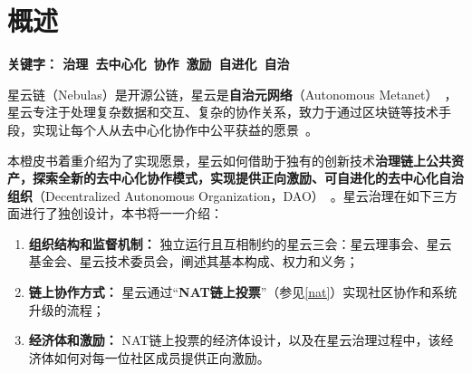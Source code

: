 \section{概述}

\textbf{关键字： 治理\ 去中心化\ 协作\ 激励\ 自进化\ 自治 }

\vspace{2em}

星云链（Nebulas）是开源公链，星云是\textbf{自治元网络}（Autonomous Metanet）~\cite{AutonomousMetanet}，星云专注于处理复杂数据和交互、复杂的协作关系，致力于通过区块链等技术手段，实现让每个人从去中心化协作中公平获益的愿景~\cite{vision}。

本橙皮书着重介绍为了实现愿景，星云如何借助于独有的创新技术\textbf{治理链上公共资产，探索全新的去中心化协作模式，实现提供正向激励、可自进化的去中心化自治组织}（Decentralized Autonomous Organization，DAO）~\cite{DAO}。星云治理在如下三方面进行了独创设计，本书将一一介绍：

\begin{enumerate}
	\item \textbf{组织结构和监督机制：}
	独立运行且互相制约的星云三会：星云理事会、星云基金会、星云技术委员会，阐述其基本构成、权力和义务；
	\item \textbf{链上协作方式：}
	星云通过“\textbf{NAT链上投票}”（参见\ref{nat}）实现社区协作和系统升级的流程；
	\item \textbf{经济体和激励：}
	NAT链上投票的经济体设计，以及在星云治理过程中，该经济体如何对每一位社区成员提供正向激励。
\end{enumerate}